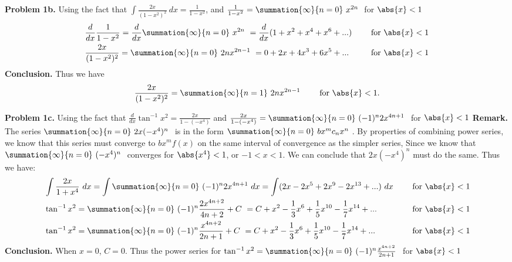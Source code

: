 \documentclass{report}
\begin{document}
    \bigbreak \noindent 
    \textbf{Problem 1b.}
    Using the fact that $\int \frac{2x}{(1-x^{2})^{2}}\ dx = \frac{1}{1-x^{2}}$, and $\frac{1}{1-x^{2}} = \summation{\infty}{n=0}\ x^{2n}\ $ for $\abs{x} < 1 $
    \begin{equation}
    \begin{alignedat}{2}
        &\frac{d}{dx}\frac{1}{1-x^{2}} = \frac{d}{dx} \summation{\infty}{n=0}\ x^{2n}\  = \frac{d}{dx} (1 + x^{2}  +x^{4} + x^{6} +...) \quad \quad  &&\text{ for } \abs{x} <1 \\
        &\frac{2x}{(1-x^{2})^{2}} = \summation{\infty}{n=0}\ 2nx^{2n-1}\ = 0 + 2x + 4x^{3} + 6x^{5} + ... \quad \quad &&\text{ for } \abs{x} < 1
    \end{alignedat}
    \end{equation}
    \textbf{Conclusion.} Thus we have
    \begin{align*}
        \frac{2x}{(1-x^{2})^{2}} = \summation{\infty}{n=1}\ 2nx^{2n-1}\ \quad \quad \text{for } \abs{x} <1 
    .\end{align*}

    \pagebreak \bigbreak \noindent 
    \textbf{Problem 1c.} Using the fact that $\frac{d}{dx}\tan^{-1}{x^{2}} = \frac{2x}{1-(-x^{4})}$ and $\frac{2x}{1-(-x^{4})} = \summation{\infty}{n=0}\ (-1)^{n}2x^{4n+1}\ $ for $\abs{x} < 1 $
    \bigbreak \noindent 
    \textbf{Remark.} The series $\summation{\infty}{n=0}\ 2x(-x^{4})^{n}\ $ is in the form $\summation{\infty}{n=0}\ bx^{m}c_{n}x^{n}\  $. By properties of combining power series, we know that this series must converge to $bx^{m}f(x)$ on the same interval of convergence as the simpler series, Since we know that $\summation{\infty}{n=0}\ (-x^{4})^{n}\  $  converges for $\abs{x^{4}} < 1 $, or $-1 < x < 1$. We can conclude that $2x(-x^{4})^{n} $ must do the same.
    \bigbreak \noindent 
    Thus we have:
    \begin{equation}
    \begin{alignedat}{2}
        &\int \frac{2x}{1+x^{4}}\ dx = \int \summation{\infty}{n=0}\ (-1)^n2x^{4n+1}\ dx = \int (2x - 2x^{5} + 2x^{9} - 2x^{13}  + ...)\ dx \quad \quad &&\text{ for } \abs{x} <1 \\
        &\tan^{-1}{x^{2}} = \summation{\infty}{n=0}\ (-1)^{n}\frac{2x^{4n+2}}{4n+2} + C\  = C + x^{2} - \frac{1}{3}x^{6}  + \frac{1}{5}x^{10} - \frac{1}{7}x^{14} + ... \quad \quad &&\text{ for } \abs{x} < 1 \\
        &\tan^{-1}{x^{2}} = \summation{\infty}{n=0}\ (-1)^{n}\frac{x^{4n+2}}{2n+1} + C\  = C + x^{2} - \frac{1}{3}x^{6}  + \frac{1}{5}x^{10} - \frac{1}{7}x^{14} + ... \quad \quad &&\text{ for } \abs{x} < 1
     \end{alignedat}
    \end{equation}
    \bigbreak \noindent 
    \textbf{Conclusion.} When $x=0$, $C=0$. Thus the power series for $\tan^{-1}{x^{2}} = \summation{\infty}{n=0}\ (-1)^{n}\frac{x^{4n+2}}{2n+1}\ $ for $\abs{x} < 1 $
\end{document}
